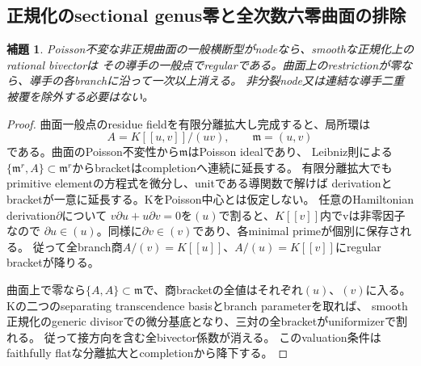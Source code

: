 \documentclass[a4paper,11pt]{ltjsarticle}
\newtheorem{lemma}[proposition]{補題}
\theoremstyle{definition}
\begin{document}
\subsection{正規化のsectional genus零と全次数六零曲面の排除}
\begin{lemma}\label{lem:generic-node-poisson-lift}
Poisson不変な非正規曲面の一般横断型がnodeなら、smoothな正規化上のrational bivectorは
その導手の一般点でregularである。曲面上のrestrictionが零なら、導手の各branchに沿って一次以上消える。
非分裂node又は連結な導手二重被覆を除外する必要はない。
\end{lemma}
\begin{proof}
曲面一般点のresidue fieldを有限分離拡大し完成すると、局所環は
\[
 A=K[[u,v]]/(uv),\qquad\mathfrak m=(u,v)
\]
である。曲面のPoisson不変性から$\mathfrak m$はPoisson idealであり、
Leibniz則による$\{\mathfrak m^r,A\}\subset\mathfrak m^r$からbracketはcompletionへ連続に延長する。
有限分離拡大でもprimitive elementの方程式を微分し、unitである導関数で解けば
derivationとbracketが一意に延長する。KをPoisson中心とは仮定しない。
任意のHamiltonian derivation$\partial$について
$v\partial u+u\partial v=0$を$(u)$で割ると、$K[[v]]$内でvは非零因子なので
$\partial u\in(u)$。同様に$\partial v\in(v)$であり、各minimal primeが個別に保存される。
従って全branch商$A/(v)=K[[u]]$、$A/(u)=K[[v]]$にregular bracketが降りる。

曲面上で零なら$\{A,A\}\subset\mathfrak m$で、商bracketの全値はそれぞれ$(u)$、$(v)$に入る。
Kの二つのseparating transcendence basisとbranch parameterを取れば、
smooth正規化のgeneric divisorでの微分基底となり、三対の全bracketがuniformizerで割れる。
従って接方向を含む全bivector係数が消える。
このvaluation条件はfaithfully flatな分離拡大とcompletionから降下する。
\end{proof}
\end{document}
